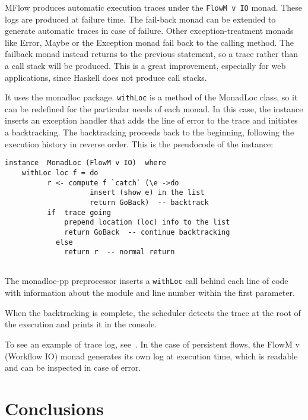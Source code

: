 \documentclass{tmr}
\begin{document}
MFlow produces automatic execution traces under the {\tt FlowM v IO} 
monad. These logs are produced at failure time. The fail-back monad can be extended to generate  automatic traces in case of failure.  Other exception-treatment monads like Error, Maybe or the Exception monad  fail back to the calling method. The failback monad instead returns to the previous statement, so  a trace rather than a call stack will be produced. This is a great improvement, especially for web applications, since Haskell does not produce call stacks.  

It  uses the monadloc\cite{auth:monadloc} package. {\tt withLoc} is a method of the MonadLoc class, so it can be redefined for the particular needs of each monad. In this case, the instance inserts an exception handler that adds the line of error to the trace and initiates a backtracking. The backtracking proceeds back to the beginning, following the execution history in reverse order.  This is the pseudocode of the instance: 
 
{\tt

\begin{verbatim}
instance  MonadLoc (FlowM v IO)  where 
    withLoc loc f = do 
          r <- compute f `catch` (\e ->do 
                    insert (show e) in the list 
                    return GoBack)  -- backtrack 
          if  trace going 
              prepend location (loc) info to the list 
              return GoBack  -- continue backtracking 
            else 
              return r  -- normal return 
 
 \end{verbatim}
 
 }
 
The monadloc-pp preprocessor inserts a {\tt withLoc} call behind each line of code with information about the module and line number within the first parameter. 

When the backtracking is complete, the scheduler detects the trace at the root of the execution and prints it in the console.
 
To see an example of trace log, see~\cite{auth:trace}. In the case of persistent flows, the FlowM v (Workflow IO) monad generates its own log at execution time, which is readable and can be inspected in case of error. 
 
\section{Conclusions} 
 
\end{document}

